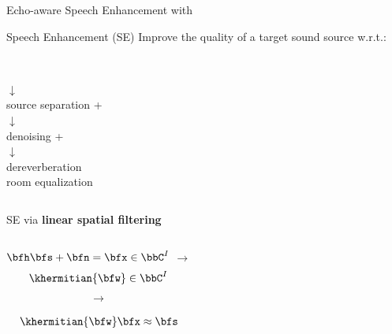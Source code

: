 \begin{frame}[t]{Echo-aware Speech Enhancement with \dechorate}
    \begin{mydefblock}{Speech Enhancement (SE)}
        Improve the quality of a \alert{target} sound source w.r.t.:
        \begin{columns}[T,onlytextwidth]
                \centering
                \\$\downarrow$
                \\source separation
            \centering
            +
                \centering
                \\$\downarrow$
                \\denoising
                \centering
                +
                \centering
                \\$\downarrow$
                \\dereverberation
                \\room equalization
        \end{columns}
    \end{mydefblock}

    \pause
    SE via \textbf{linear spatial filtering}
    \begin{columns}[onlytextwidth]
        \centering
            $\bfh\bfs + \bfn = \bfx \in \bbC^{I}$
        \centering
            $\longrightarrow$
        \centering
        \begin{align*}
            \khermitian{\bfw} \in \bbC^{I} \\
        \end{align*}
        \centering
        \begin{align*}
            \longrightarrow \\
        \end{align*}
        \centering
        \begin{align*}
            \khermitian{\bfw} \bfx \approx \bfs \\
        \end{align*}
    \end{columns}


\end{frame}
